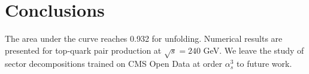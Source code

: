 \section{Conclusions}\label{sec:conclusions}

The area under the curve reaches 0.932 for unfolding. Numerical results
are presented for top-quark pair production at $\sqrt{s} = 240$ GeV. We
leave the study of sector decompositions trained on CMS Open Data at
order $\alpha_s^3$ to future work.

